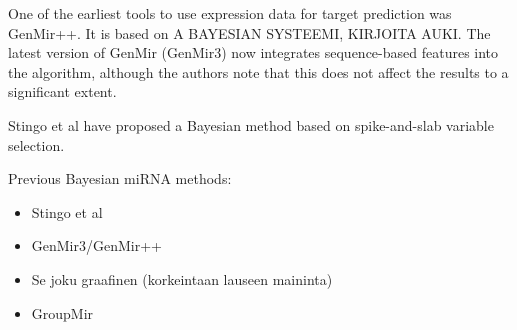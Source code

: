 
One of the earliest tools to use expression data for target prediction was
GenMir++. It is based on A BAYESIAN SYSTEEMI, KIRJOITA AUKI.
The latest version of GenMir (GenMir3) now integrates sequence-based features
into the algorithm, although the authors note that this does not affect the
results to a significant extent.

Stingo et al have proposed a Bayesian method based on spike-and-slab variable
selection.

Previous Bayesian miRNA methods:
\begin{itemize}
  \item Stingo et al
  \item GenMir3/GenMir++
  \item Se joku graafinen (korkeintaan lauseen maininta)
  \item GroupMir
\end{itemize}
